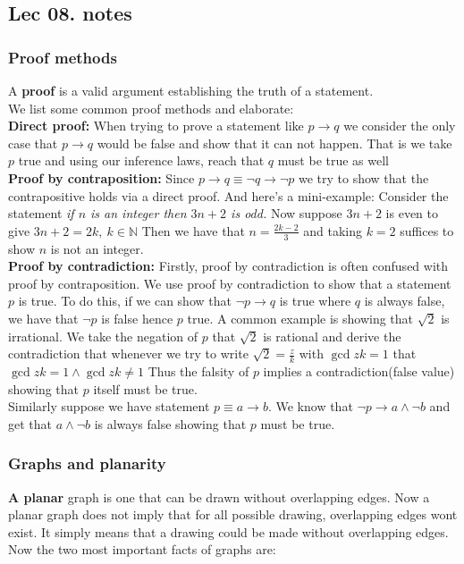 \documentclass[titlepage]{article}
\theoremstyle{definition}
\numberwithin{equation}{subsection}
\numberwithin{remark}{subsection}
\begin{document}
\subsection{Lec 08. notes}
\subsubsection{Proof methods}
A \textbf{proof} is a valid argument establishing the truth of a statement. 
\\
We list some common proof methods and elaborate:
\\
\textbf{Direct proof:} When trying to prove a statement like $p \rightarrow q$ we consider the only case that $p \rightarrow q$ would be false and show that it can not happen. That is we take $p$ true and using our inference laws, reach that $q$ must be true as well 
\\
\textbf{Proof by contraposition:} Since $p\rightarrow q \equiv \neg q \rightarrow \neg p$ we try to show that the contrapositive holds via a direct proof. And here's a mini-example: Consider the statement \textit{if $n$ is an integer then $3n+2$ is odd.} Now suppose $3n+2$ is even to give $3n+2 = 2k, \ k\in \mathbb{N}$ Then we have that $n=\frac{2k-2}{3}$ and taking $k=2$ suffices to show $n$ is not an integer. 
\\
\textbf{Proof by contradiction:} Firstly, proof by contradiction is often confused with proof by contraposition. We use proof by contradiction to show that a statement $p$ is true. To do this, if we can show that $\neg p \rightarrow q$ is true where $q$ is always false, we have that $\neg p$ is false hence $p$ true. A common example is showing that $\sqrt{2}$ is irrational. We take the negation of $p$ that $\sqrt{2}$ is rational and derive the contradiction that whenever we try to write $\sqrt{2} = \frac{z}{k}$ with $\gcd{z}{k} = 1$ that $\gcd{z}{k} = 1 \land \gcd{z}{k} \not = 1$ Thus the falsity of $p$ implies a contradiction(false value) showing that $p$ itself must be true. 
\\
Similarly suppose we have statement $p\equiv a \rightarrow b$. We know that $\neg p \rightarrow a \land \neg b$ and get that $a\land \neg b$ is always false showing that $p$ must be true. 
\subsubsection{Graphs and planarity}
\textbf{A planar} graph is one that can be drawn without overlapping edges. Now a planar graph does not imply that for all possible drawing, overlapping edges wont exist. It simply means that a drawing could be made without overlapping edges. Now the two most important facts of graphs are:
\end{document}
